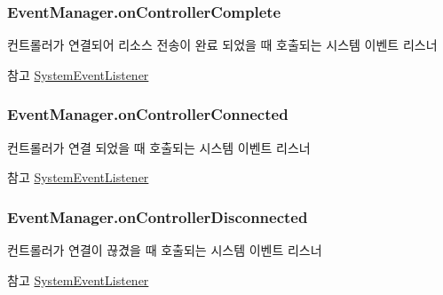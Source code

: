 \subsubsection[{on\+Controller\+Complete}]{ Event\+Manager.\+on\+Controller\+Complete}\label{class_event_manager_af12f0caee161b1b2222cfd13cd957750}
컨트롤러가 연결되어 리소스 전송이 완료 되었을 때 호출되는 시스템 이벤트 리스너 \begin{DoxySeeAlso}{참고}
\hyperlink{class_event_manager_a65e017fcb7c22959f09becc40ad3bc2d}{System\+Event\+Listener} 
\end{DoxySeeAlso}
\hypertarget{class_event_manager_a1982ee974be3949930955adbf2b69416}{}
\subsubsection[{on\+Controller\+Connected}]{ Event\+Manager.\+on\+Controller\+Connected}\label{class_event_manager_a1982ee974be3949930955adbf2b69416}
컨트롤러가 연결 되었을 때 호출되는 시스템 이벤트 리스너 \begin{DoxySeeAlso}{참고}
\hyperlink{class_event_manager_a65e017fcb7c22959f09becc40ad3bc2d}{System\+Event\+Listener} 
\end{DoxySeeAlso}
\hypertarget{class_event_manager_a8f4ec7cfc6f0ca0d4a5872997b359861}{}
\subsubsection[{on\+Controller\+Disconnected}]{ Event\+Manager.\+on\+Controller\+Disconnected}\label{class_event_manager_a8f4ec7cfc6f0ca0d4a5872997b359861}
컨트롤러가 연결이 끊겼을 때 호출되는 시스템 이벤트 리스너 \begin{DoxySeeAlso}{참고}
\hyperlink{class_event_manager_a65e017fcb7c22959f09becc40ad3bc2d}{System\+Event\+Listener} 
\end{DoxySeeAlso}
\hypertarget{class_event_manager_aabcdea295255f84519ce6c7ef7026b64}{}
